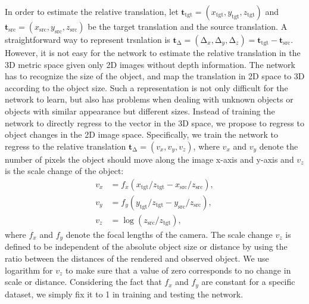 \documentclass[twocolumn]{svjour3}
\begin{document}
In order to estimate the relative translation, let $\mathbf{t}_{\text{tgt}}=(x_{\text{tgt}}, y_{\text{tgt}}, z_{\text{tgt}})$ and $\mathbf{t}_{\text{src}}=(x_{\text{src}}, y_{\text{src}}, z_{\text{src}})$ be the target translation and the source translation. A straightforward way to represent trsnlation is  $\mathbf{t}_\mathrm{\Delta} = (\mathrm{\Delta}_x, \mathrm{\Delta}_y, \mathrm{\Delta}_z) = \mathbf{t}_{\text{tgt}} - \mathbf{t}_{\text{src}} $. However, it is not easy for the network to estimate the relative translation in the 3D metric space given only 2D images without depth information. The network has to recognize the size of the object, and map the translation in 2D space to 3D according to the object size. Such a representation is not only difficult for the network to learn, but also has problems when dealing with unknown objects or objects with similar appearance but different sizes. Instead of training the network to directly regress to the vector in the 3D space, we propose to regress to object changes in the 2D image space. Specifically, we train the network to regress to the relative translation $\mathbf{t}_\mathrm{\Delta} = (v_x, v_y, v_z)$, where $v_x$ and $v_y$ denote the number of pixels the object should move along the image x-axis and y-axis and $v_z$ is  the scale change of the object:
\begin{equation}
\begin{split}
v_x &= f_x (x_{\text{tgt}} / z_{\text{tgt}} - x_{\text{src}} / z_{\text{src}}), \\
v_y &= f_y (y_{\text{tgt}} / z_{\text{tgt}} - y_{\text{src}} / z_{\text{src}}), \\
v_z &= \log(z_{\text{src}} / z_{\text{tgt}}),
\end{split}
\label{eq.2d_translation}
\end{equation}
where $f_x$ and $f_y$ denote the focal lengths of the camera. The scale change $v_z$ is defined to be independent of the absolute object size or distance by using the ratio between the distances of the rendered and observed object. We use logarithm for $v_z$ to make sure that a value of zero corresponds to no change in scale or distance. Considering the fact that $f_x$ and $f_y$ are constant for a specific dataset, we simply fix it to 1 in training and testing the network.

\end{document}
